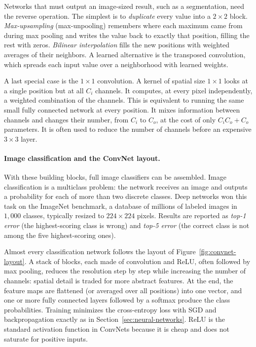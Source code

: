 Networks that must output an image-sized result, such as a segmentation, need the
reverse operation. The simplest is to \emph{duplicate} every value into a
$2\times2$ block. \emph{Max-upsampling} (max-unpooling) remembers where each
maximum came from during max pooling and writes the value back to exactly that
position, filling the rest with zeros. \emph{Bilinear interpolation} fills the
new positions with weighted averages of their neighbors. A learned alternative is
the transposed convolution, which spreads each input value over a neighborhood
with learned weights.

A last special case is the $1\times1$ convolution. A kernel of spatial size $1\times1$ looks at a single position but at all $C_i$
channels. It computes, at every pixel independently, a weighted combination of
the channels. This is equivalent to running the same small fully connected
network at every position. It mixes information between channels and changes
their number, from $C_i$ to $C_o$, at the cost of only $C_i C_o + C_o$
parameters. It is often used to reduce the number of channels before an
expensive $3\times3$ layer.

\paragraph{Image classification and the ConvNet layout.}
With these building blocks, full image classifiers can be assembled. Image
classification is a multiclass problem: the network receives an image and
outputs a probability for each of more than two discrete classes. Deep networks
won this task on the ImageNet benchmark, a database of millions of labeled
images in $1{,}000$ classes, typically resized to $224\times224$ pixels. Results
are reported as \emph{top-1 error} (the highest-scoring class is wrong) and
\emph{top-5 error} (the correct class is not among the five highest-scoring
ones).

Almost every classification network follows the layout of
Figure~\ref{fig:convnet-layout}. A stack of blocks, each made of convolution and
ReLU, often followed by max pooling, reduces the resolution step by step while
increasing the number of channels: spatial detail is traded for more abstract
features. At the end, the feature maps are flattened (or averaged over all
positions) into one vector, and one or more fully connected layers followed by a
softmax produce the class probabilities. Training minimizes the cross-entropy
loss with SGD and backpropagation exactly as in
Section~\ref{sec:neural-networks}. ReLU is the standard activation function in
ConvNets because it is cheap and does not saturate for positive inputs.

